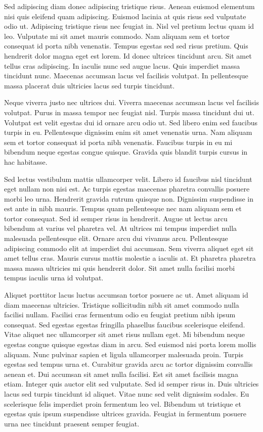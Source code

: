 \documentclass[11pt,a4paper]{article}
\begin{document}
Sed adipiscing diam donec adipiscing tristique risus. Aenean euismod elementum nisi quis eleifend quam adipiscing. Euismod lacinia at quis risus sed vulputate odio ut. Adipiscing tristique risus nec feugiat in. Nisl vel pretium lectus quam id leo. Vulputate mi sit amet mauris commodo. Nam aliquam sem et tortor consequat id porta nibh venenatis. Tempus egestas sed sed risus pretium. Quis hendrerit dolor magna eget est lorem. Id donec ultrices tincidunt arcu. Sit amet tellus cras adipiscing. In iaculis nunc sed augue lacus. Quis imperdiet massa tincidunt nunc. Maecenas accumsan lacus vel facilisis volutpat. In pellentesque massa placerat duis ultricies lacus sed turpis tincidunt.

Neque viverra justo nec ultrices dui. Viverra maecenas accumsan lacus vel facilisis volutpat. Purus in massa tempor nec feugiat nisl. Turpis massa tincidunt dui ut. Volutpat est velit egestas dui id ornare arcu odio ut. Sed libero enim sed faucibus turpis in eu. Pellentesque dignissim enim sit amet venenatis urna. Nam aliquam sem et tortor consequat id porta nibh venenatis. Faucibus turpis in eu mi bibendum neque egestas congue quisque. Gravida quis blandit turpis cursus in hac habitasse.

Sed lectus vestibulum mattis ullamcorper velit. Libero id faucibus nisl tincidunt eget nullam non nisi est. Ac turpis egestas maecenas pharetra convallis posuere morbi leo urna. Hendrerit gravida rutrum quisque non. Dignissim suspendisse in est ante in nibh mauris. Tempus quam pellentesque nec nam aliquam sem et tortor consequat. Sed id semper risus in hendrerit. Augue ut lectus arcu bibendum at varius vel pharetra vel. At ultrices mi tempus imperdiet nulla malesuada pellentesque elit. Ornare arcu dui vivamus arcu. Pellentesque adipiscing commodo elit at imperdiet dui accumsan. Sem viverra aliquet eget sit amet tellus cras. Mauris cursus mattis molestie a iaculis at. Et pharetra pharetra massa massa ultricies mi quis hendrerit dolor. Sit amet nulla facilisi morbi tempus iaculis urna id volutpat.

Aliquet porttitor lacus luctus accumsan tortor posuere ac ut. Amet aliquam id diam maecenas ultricies. Tristique sollicitudin nibh sit amet commodo nulla facilisi nullam. Facilisi cras fermentum odio eu feugiat pretium nibh ipsum consequat. Sed egestas egestas fringilla phasellus faucibus scelerisque eleifend. Vitae aliquet nec ullamcorper sit amet risus nullam eget. Mi bibendum neque egestas congue quisque egestas diam in arcu. Sed euismod nisi porta lorem mollis aliquam. Nunc pulvinar sapien et ligula ullamcorper malesuada proin. Turpis egestas sed tempus urna et. Curabitur gravida arcu ac tortor dignissim convallis aenean et. Dui accumsan sit amet nulla facilisi. Est sit amet facilisis magna etiam. Integer quis auctor elit sed vulputate. Sed id semper risus in. Duis ultricies lacus sed turpis tincidunt id aliquet. Vitae nunc sed velit dignissim sodales. Eu scelerisque felis imperdiet proin fermentum leo vel. Bibendum ut tristique et egestas quis ipsum suspendisse ultrices gravida. Feugiat in fermentum posuere urna nec tincidunt praesent semper feugiat.
\end{document}
